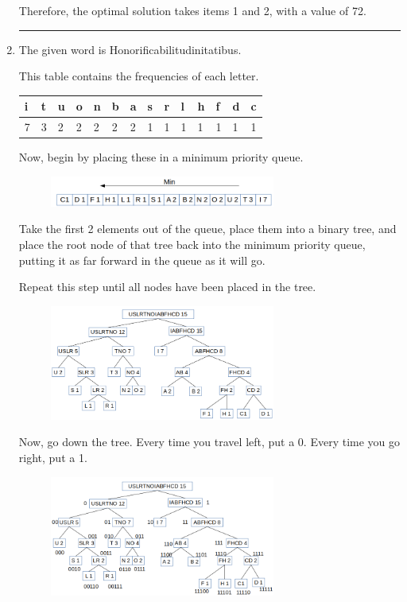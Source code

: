 \documentclass{article}
\begin{document}
\begin{enumerate}
Therefore, the optimal solution takes items 1 and 2, with a value of 72. 

\noindent\rule{8cm}{0.4pt}

\item  The given word is Honorificabilitudinitatibus. 

    This table contains the frequencies of each letter. 
\begin{table}[H]
\begin{tabular}{|l|l|l|l|l|l|l|l|l|l|l|l|l|l|}
\hline
i & t & u & o & n & b & a & s & r & l & h & f & d & c \\ \hline
7 & 3 & 2 & 2 & 2 & 2 & 2 & 1 & 1 & 1 & 1 & 1 & 1 & 1 \\ \hline
\end{tabular}
\end{table}

Now, begin by placing these in a minimum priority queue. 

\begin{figure}[H]
	\includegraphics[width=0.7\textwidth]{P9/queue}
\end{figure}


Take the first 2 elements out of the queue, place them into a binary tree, and place the root node of that tree back into the minimum priority queue, putting it as far forward in the queue as it will go. 

Repeat this step until all nodes have been placed in the tree. 
\begin{figure}[H]
	\includegraphics[width=0.7\textwidth]{P9/tree}
\end{figure}

Now, go down the tree. Every time you travel left, put a 0. Every time you go right, put a 1. 


\begin{figure}[H]
	\includegraphics[width=0.7\textwidth]{P9/tree_num}
\end{figure}


\end{enumerate}
\end{document}
